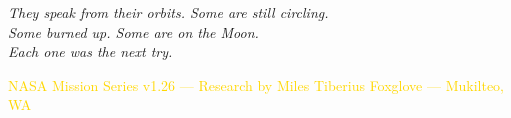 \documentclass[12pt]{article}
\begin{document}
\vspace{2em}

\begin{center}
\textcolor{cactus}{\textit{They speak from their orbits. Some are still circling.\\
Some burned up. Some are on the Moon.\\
Each one was the next try.}}
\end{center}

\vspace{1em}

\begin{center}
\small\textcolor{gold}{NASA Mission Series v1.26 --- Research by Miles Tiberius Foxglove --- Mukilteo, WA}
\end{center}
\end{document}
